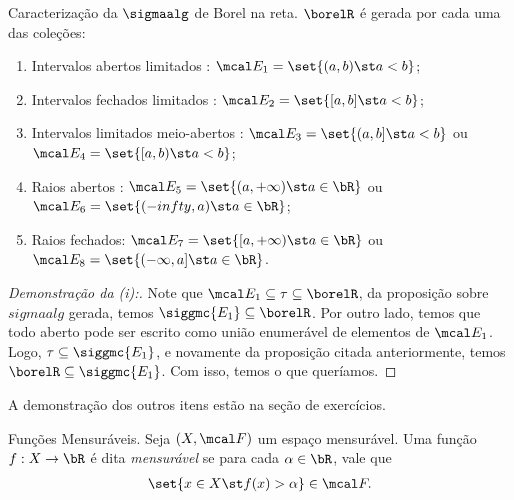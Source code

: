 \begin{prop*}{Caracterização da $\sigmaalg$ de Borel na reta.}
  $\borelR$ é gerada por cada uma das coleções:
  \begin{enumerate}[label=(\roman*)]
    \item Intervalos abertos limitados : $\mcal E_1 = \set{(a, b) \st a<b}$;
    \item Intervalos fechados limitados : $\mcal E_2 = \set{[a, b] \st a<b}$;
    \item Intervalos limitados meio-abertos : $\mcal E_3 = \set{(a, b] \st a<b}$ 
      ou $\mcal E_4 = \set{[a, b)\st a< b}$;
    \item Raios abertos : $\mcal E_5 = \set{(a, +\infty)\st a \in \bR}$
      ou $\mcal E_6 = \set{(-infty, a)\st a \in \bR}$;
    \item Raios fechados: $\mcal E_7 = \set{[a, +\infty)\st a \in \bR}$
      ou $\mcal E_8 = \set{(-\infty, a]\st a \in \bR}$.
  \end{enumerate}
\end{prop*}
\begin{proof}[Demonstração da (i):] Note que $\mcal E_1 \subseteq \tau \subseteq \borelR$,
  da proposição sobre $sigmaalg$ gerada, temos $\siggmc {E_1} \subseteq \borelR$. Por 
  outro lado, temos que todo aberto pode ser escrito como união enumerável 
  de elementos de $\mcal E_1$. Logo, $\tau \subseteq \siggmc{E_1}$, e 
  novamente da proposição citada anteriormente, temos $\borelR \subseteq \siggmc{E_1}$. 
  Com isso, temos o que queríamos.
\end{proof}

A demonstração dos outros itens estão na seção de exercícios.

\bigline
{}
\begin{definition*}{Funções Mensuráveis.}
  Seja $(X, \mcal F)$ um espaço mensurável. Uma função $f: X \rightarrow \bR$ é 
  dita \textit{mensurável} se para cada $\alpha \in \bR$, vale que 
  \begin{align*}
    \set{x \in X\st f(x)> \alpha} \in \mcal F.
  \end{align*}
\end{definition*}

